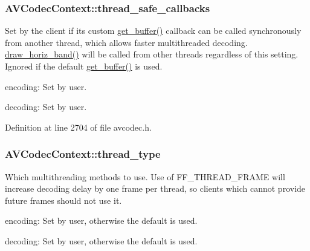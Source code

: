 \subsubsection[{\texorpdfstring{thread\+\_\+safe\+\_\+callbacks}{thread_safe_callbacks}}]{ A\+V\+Codec\+Context\+::thread\+\_\+safe\+\_\+callbacks}\hypertarget{struct_a_v_codec_context_a5bd9a6f252d615243d01198fd3957fd8}{}\label{struct_a_v_codec_context_a5bd9a6f252d615243d01198fd3957fd8}
Set by the client if its custom \hyperlink{struct_a_v_codec_context_abc3a806b73306162efa218510448d54f}{get\+\_\+buffer()} callback can be called synchronously from another thread, which allows faster multithreaded decoding. \hyperlink{struct_a_v_codec_context_a692cb615f8045df330ec0a12852b5252}{draw\+\_\+horiz\+\_\+band()} will be called from other threads regardless of this setting. Ignored if the default \hyperlink{struct_a_v_codec_context_abc3a806b73306162efa218510448d54f}{get\+\_\+buffer()} is used.
\begin{DoxyItemize}
\item encoding\+: Set by user.
\item decoding\+: Set by user. 
\end{DoxyItemize}

Definition at line 2704 of file avcodec.\+h.

\subsubsection[{\texorpdfstring{thread\+\_\+type}{thread_type}}]{ A\+V\+Codec\+Context\+::thread\+\_\+type}\hypertarget{struct_a_v_codec_context_a7651614f4309122981d70e06a4b42fcb}{}\label{struct_a_v_codec_context_a7651614f4309122981d70e06a4b42fcb}
Which multithreading methods to use. Use of F\+F\+\_\+\+T\+H\+R\+E\+A\+D\+\_\+\+F\+R\+A\+ME will increase decoding delay by one frame per thread, so clients which cannot provide future frames should not use it.


\begin{DoxyItemize}
\item encoding\+: Set by user, otherwise the default is used.
\item decoding\+: Set by user, otherwise the default is used. 
\end{DoxyItemize}

